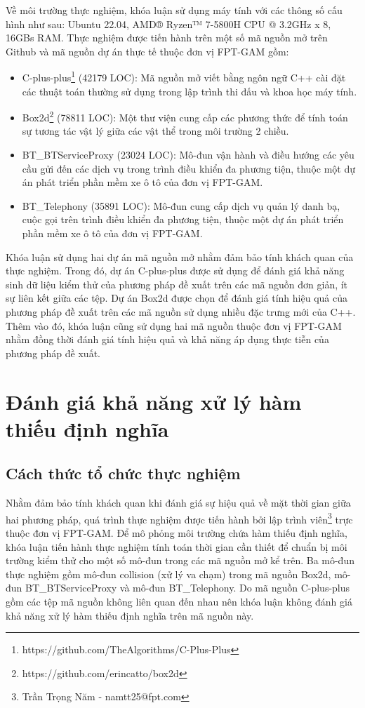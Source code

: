 Về môi trường thực nghiệm, khóa luận sử dụng máy tính với các thông số cấu hình như sau: Ubuntu 22.04, AMD® Ryzen™ 7-5800H CPU @ 3.2GHz x 8, 16GBs RAM. Thực nghiệm được tiến hành trên một số mã nguồn mở trên Github và mã nguồn dự án thực tế thuộc đơn vị FPT-GAM gồm:
\begin{itemize}
    \item C-plus-plus\footnote{https://github.com/TheAlgorithms/C-Plus-Plus} (42179 LOC): Mã nguồn mở viết bằng ngôn ngữ C++ cài đặt các thuật toán thường sử dụng trong lập trình thi đấu và khoa học máy tính.
    \item Box2d\footnote{https://github.com/erincatto/box2d} (78811 LOC): Một thư viện cung cấp các phương thức để tính toán sự tương tác vật lý giữa các vật thể trong môi trường 2 chiều.
    \item BT\_BTServiceProxy (23024 LOC): Mô-đun vận hành và điều hướng các yêu cầu gửi đến các dịch vụ trong trình điều khiển đa phương tiện, thuộc một dự án phát triển phần mềm xe ô tô của đơn vị FPT-GAM.
    \item BT\_Telephony (35891 LOC): Mô-đun cung cấp dịch vụ quản lý danh bạ, cuộc gọi trên trình điều khiển đa phương tiện, thuộc một dự án phát triển phần mềm xe ô tô của đơn vị FPT-GAM.
\end{itemize}

Khóa luận sử dụng hai dự án mã nguồn mở nhằm đảm bảo tính khách quan của thực nghiệm. Trong đó, dự án C-plus-plus được sử dụng để đánh giá khả năng sinh dữ liệu kiểm thử của phương pháp đề xuất trên các mã nguồn đơn giản, ít sự liên kết giữa các tệp. Dự án Box2d được chọn để đánh giá tính hiệu quả của phương pháp đề xuất trên các mã nguồn sử dụng nhiều đặc trưng mới của C++. Thêm vào đó, khóa luận cũng sử dụng hai mã nguồn thuộc đơn vị FPT-GAM nhằm đồng thời đánh giá tính hiệu quả và khả năng áp dụng thực tiễn của phương pháp đề xuất.

\section{Đánh giá khả năng xử lý hàm thiếu định nghĩa}
\subsection{Cách thức tổ chức thực nghiệm}
Nhằm đảm bảo tính khách quan khi đánh giá sự hiệu quả về mặt thời gian giữa hai phương pháp, quá trình thực nghiệm được tiến hành bởi lập trình viên\footnote{Trần Trọng Năm - namtt25@fpt.com} trực thuộc đơn vị FPT-GAM. Để mô phỏng môi trường chứa hàm thiếu định nghĩa, khóa luận tiến hành thực nghiệm tính toán thời gian cần thiết để chuẩn bị môi trường kiểm thử cho một số mô-đun trong các mã nguồn mở kể trên. Ba mô-đun thực nghiệm gồm mô-đun collision (xử lý va chạm) trong mã nguồn Box2d, mô-đun BT\_BTServiceProxy và mô-đun BT\_Telephony. Do mã nguồn C-plus-plus gồm các tệp mã nguồn không liên quan đến nhau nên khóa luận không đánh giá khả năng xử lý hàm thiếu định nghĩa trên mã nguồn này.

